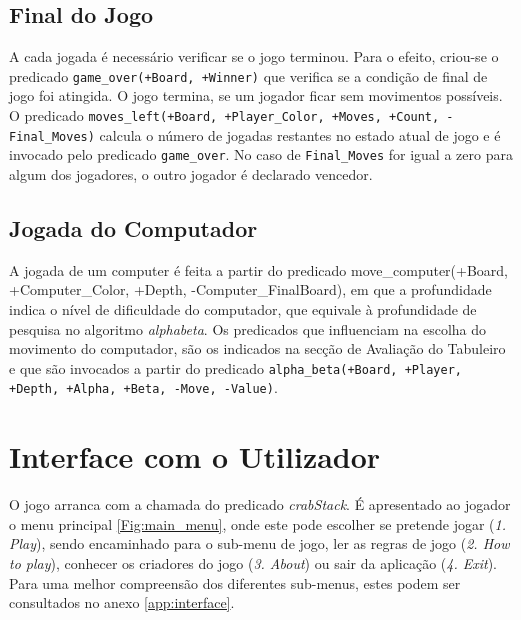 \documentclass[a4paper]{article}
\begin{document}
\subsection{Final do Jogo}
A cada jogada é necessário verificar se o jogo terminou. Para o efeito, criou-se o predicado \texttt{game\_over(+Board, +Winner)} que verifica se a condição de final de jogo foi atingida. O jogo termina, se um jogador ficar sem movimentos possíveis. O predicado \texttt{moves\_left(+Board, +Player\_Color, +Moves, +Count, -Final\_Moves)} calcula o número de jogadas restantes no estado atual de jogo e é invocado pelo predicado \texttt{game\_over}. No caso de \texttt{Final\_Moves} for igual a zero para algum dos jogadores, o outro jogador é declarado vencedor.

\subsection{Jogada do Computador}

A jogada de um \textrm{computer} é feita a partir do predicado
move\_computer(+Board, +Computer\_Color, +Depth, -Computer\_FinalBoard), em que a profundidade indica o nível de dificuldade do computador, que equivale à profundidade de pesquisa no algoritmo \textit{alphabeta}. Os predicados que influenciam na escolha do movimento do computador, são os indicados na secção de Avaliação do Tabuleiro e que são invocados a partir do predicado 
\texttt{alpha\_beta(+Board, +Player, +Depth, +Alpha, +Beta, -Move, -Value)}.

\section{Interface com o Utilizador}

O jogo arranca com a chamada do predicado \textit{crabStack}. É apresentado ao jogador o menu principal \ref{Fig:main_menu}, onde este pode escolher se pretende jogar (\textit{1. Play}), sendo encaminhado para o sub-menu de jogo, ler as regras de jogo (\textit{2. How to play}), conhecer os criadores do jogo (\textit{3. About}) ou sair da aplicação (\textit{4. Exit}). Para uma melhor compreensão dos diferentes sub-menus, estes podem ser consultados no anexo \ref{app:interface}.\\
\end{document}
